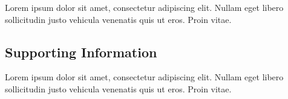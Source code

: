 \documentclass[a4paper]{article}
\begin{document}
        Lorem ipsum dolor sit amet, consectetur adipiscing elit. Nullam eget libero sollicitudin justo vehicula venenatis quis ut eros. Proin vitae.

        \subsection{Supporting Information}

        Lorem ipsum dolor sit amet, consectetur adipiscing elit. Nullam eget libero sollicitudin justo vehicula venenatis quis ut eros. Proin vitae.
\end{document}
